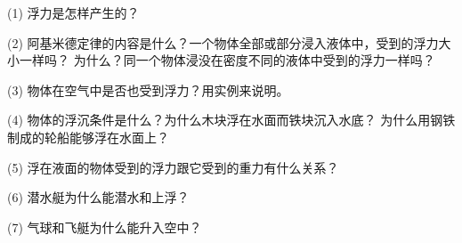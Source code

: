\label{sec:6-fuxi}

(1) 浮力是怎样产生的？

(2) 阿基米德定律的内容是什么？一个物体全部或部分浸入液体中，受到的浮力大小一样吗？
为什么？同一个物体浸没在密度不同的液体中受到的浮力一样吗？

(3) 物体在空气中是否也受到浮力？用实例来说明。

(4) 物体的浮沉条件是什么？为什么木块浮在水面而铁块沉入水底？
为什么用钢铁制成的轮船能够浮在水面上？

(5) 浮在液面的物体受到的浮力跟它受到的重力有什么关系？

(6) 潜水艇为什么能潜水和上浮？

(7) 气球和飞艇为什么能升入空中？


